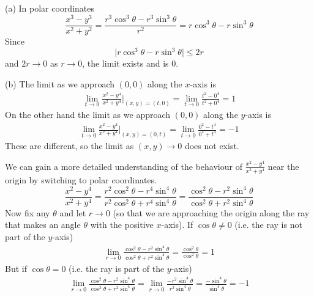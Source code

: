 \begin{solution}
(a) In polar coordinates
\begin{equation*}
\frac{x^3-y^3}{x^2+y^2}=\frac{r^3\cos^3\theta-r^3\sin^3\theta}{r^2}
=r\cos^3\theta-r\sin^3\theta
\end{equation*}
Since
\begin{equation*}
\big|r\cos^3\theta-r\sin^3\theta\big|\le 2r
\end{equation*}
and $2r\rightarrow 0$ as $r\rightarrow 0$, the limit exists and is $0$.

(b)
The limit as we approach $(0,0)$ along the $x$-axis is
\begin{align*}
\lim_{t\rightarrow 0}\frac{x^2-y^4}{x^2+y^4}\bigg|_{(x,y)=(t,0)}
=\lim_{t\rightarrow 0}\frac{t^2-0^4}{t^2+0^4}
=1
\end{align*}
On the other hand the limit as we approach $(0,0)$ along the $y$-axis is
\begin{align*}
\lim_{t\rightarrow 0}\frac{x^2-y^4}{x^2+y^4}\bigg|_{(x,y)=(0,t)}
=\lim_{t\rightarrow 0}\frac{0^2-t^4}{0^2+t^4}
=-1
\end{align*}
These are different, so the limit as $(x,y)\rightarrow 0$ does not exist.

We can gain a more detailed understanding of the behaviour of 
$\frac{x^2-y^4}{x^2+y^4}$ near the origin by switching to polar coordinates.
\begin{equation*}
\frac{x^2-y^4}{x^2+y^4}
=\frac{r^2\cos^2\theta-r^4\sin^4\theta}{r^2\cos^2\theta+r^4\sin^4\theta}
=\frac{\cos^2\theta-r^2\sin^4\theta}{\cos^2\theta+r^2\sin^4\theta}
\end{equation*}
Now fix any $\theta$ and let $r\rightarrow 0$ (so that we are approaching the origin along the ray that makes an angle $\theta$ with the positive $x$-axis).
If $\cos\theta\ne 0$ (i.e. the ray is not part of the $y$-axis)
\begin{align*}
\lim_{r\rightarrow 0}
     \frac{\cos^2\theta-r^2\sin^4\theta}{\cos^2\theta+r^2\sin^4\theta}
=\frac{\cos^2\theta}{\cos^2\theta}
=1
\end{align*}
But if $\cos\theta= 0$ (i.e. the ray is part of the $y$-axis)
\begin{align*}
\lim_{r\rightarrow 0}
     \frac{\cos^2\theta-r^2\sin^4\theta}{\cos^2\theta+r^2\sin^4\theta}
=\lim_{r\rightarrow 0}
     \frac{-r^2\sin^4\theta}{r^2\sin^4\theta}
=\frac{-\sin^4\theta}{\sin^4\theta}
=-1
\end{align*}
\end{solution}

